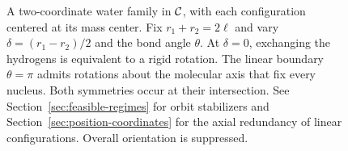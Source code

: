 \begin{figure}[htbp]
\caption{A two-coordinate water family in $\mathcal{C}$, with each
configuration centered at its mass center. Fix $r_1+r_2=2\ell$ and vary
$\delta=(r_1-r_2)/2$ and the bond angle $\theta$.
At $\delta=0$, exchanging the hydrogens is equivalent to a rigid rotation.
The linear boundary $\theta=\pi$ admits rotations about the molecular
axis that fix every nucleus. Both symmetries occur at their intersection.
See Section~\ref{sec:feasible-regimes} for orbit stabilizers and
Section~\ref{sec:position-coordinates} for the axial redundancy of
linear configurations. Overall orientation is suppressed.}
\label{fig:configuration-orbit}
\end{figure}
